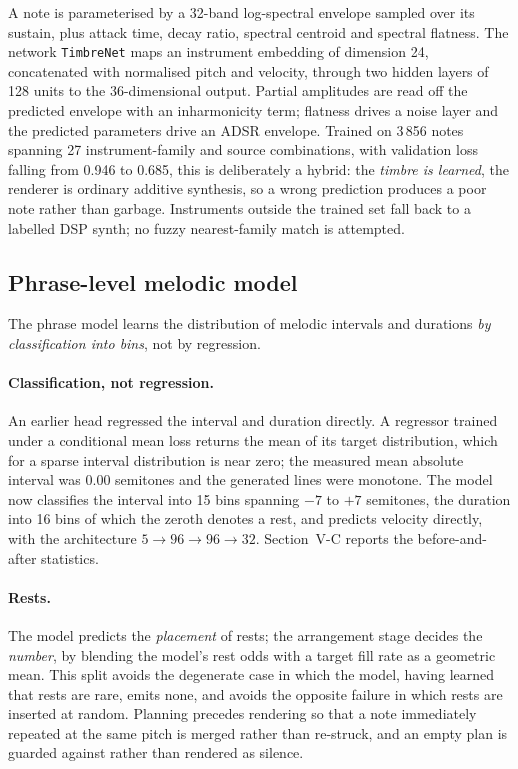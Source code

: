 \documentclass[conference]{IEEEtran}
\begin{document}
A note is parameterised by a 32-band log-spectral envelope sampled over its
sustain, plus attack time, decay ratio, spectral centroid and spectral
flatness. The network \texttt{TimbreNet} maps an instrument embedding of
dimension 24, concatenated with normalised pitch and velocity, through two
hidden layers of 128 units to the 36-dimensional output. Partial amplitudes are
read off the predicted envelope with an inharmonicity term; flatness drives a
noise layer and the predicted parameters drive an ADSR envelope. Trained on
3\,856 notes spanning 27 instrument-family and source combinations, with
validation loss falling from 0.946 to 0.685, this is deliberately a hybrid: the
\emph{timbre is learned}, the renderer is ordinary additive synthesis, so a
wrong prediction produces a poor note rather than garbage. Instruments outside
the trained set fall back to a labelled DSP synth; no fuzzy nearest-family match
is attempted.

\subsection{Phrase-level melodic model}

The phrase model learns the distribution of melodic intervals and durations
\emph{by classification into bins}, not by regression.

\paragraph{Classification, not regression.} An earlier head regressed the
interval and duration directly. A regressor trained under a conditional mean
loss returns the mean of its target distribution, which for a sparse interval
distribution is near zero; the measured mean absolute interval was 0.00
semitones and the generated lines were monotone. The model now classifies the
interval into 15 bins spanning $-7$ to $+7$ semitones, the duration into 16 bins
of which the zeroth denotes a rest, and predicts velocity directly, with the
architecture $5 \rightarrow 96 \rightarrow 96 \rightarrow 32$. Section~V-C
reports the before-and-after statistics.

\paragraph{Rests.} The model predicts the \emph{placement} of rests; the
arrangement stage decides the \emph{number}, by blending the model's rest
odds with a target fill rate as a geometric mean. This split avoids the
degenerate case in which the model, having learned that rests are rare,
emits none, and avoids the opposite failure in which rests are inserted at
random. Planning precedes rendering so that a note immediately repeated at the
same pitch is merged rather than re-struck, and an empty plan is guarded
against rather than rendered as silence.
\end{document}
